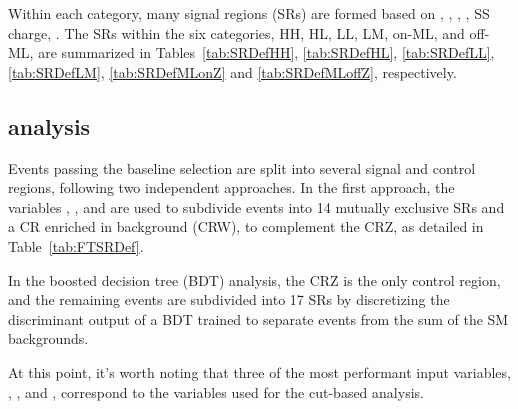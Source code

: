 Within each category, many signal regions (SRs) are formed based on 
\Njets, \Nbjets, \HT, \ptmiss, SS charge, \mtmin.
The SRs
within the six categories, HH, HL, LL, LM, on-\PZ ML, and off-\PZ ML,
are summarized in Tables~\ref{tab:SRDefHH}, \ref{tab:SRDefHL},
\ref{tab:SRDefLL}, \ref{tab:SRDefLM}, \ref{tab:SRDefMLonZ} and
\ref{tab:SRDefMLoffZ}, respectively. 



\subsection{\smft analysis}

Events passing the baseline selection are split into several signal and
control regions, following two independent approaches. In the first approach,
the variables \Njets, \Nbjets, and \Nleps are used to subdivide events into
14 mutually exclusive SRs and a CR enriched in \ttW background (CRW), to
complement the CRZ, as detailed in Table~\ref{tab:FTSRDef}.

In the boosted decision tree (BDT) analysis, the CRZ is the only control
region, and the remaining events are subdivided into 17 SRs by discretizing
the discriminant output of a BDT trained to separate \tttt events from the
sum of the SM backgrounds.

At this point, it's worth noting that 
three of the most performant input variables, \Njets, \Nbjets, and \Nleps, correspond to the variables used for the cut-based analysis.

